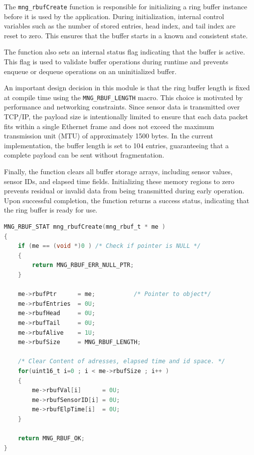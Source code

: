 \documentclass{article}
\begin{document}
The \texttt{mng\_rbufCreate} function is responsible for initializing a ring buffer 
instance before it is used by the application. During initialization, internal control 
variables such as the number of stored entries, head index, and tail index are reset to 
zero. This ensures that the buffer starts in a known and consistent state.

The function also sets an internal status flag indicating that the buffer is active. 
This flag is used to validate buffer operations during runtime and prevents enqueue or 
dequeue operations on an uninitialized buffer.

An important design decision in this module is that the ring buffer length is fixed at 
compile time using the \texttt{MNG\_RBUF\_LENGTH} macro. This choice is motivated by 
performance and networking constraints. Since sensor data is transmitted over TCP/IP, 
the payload size is intentionally limited to ensure that each data packet fits within a 
single Ethernet frame and does not exceed the maximum transmission unit (MTU) of 
approximately 1500 bytes. In the current implementation, the buffer length is set to 
104 entries, guaranteeing that a complete payload can be sent without fragmentation.

Finally, the function clears all buffer storage arrays, including sensor values, sensor 
IDs, and elapsed time fields. Initializing these memory regions to zero prevents 
residual or invalid data from being transmitted during early operation. Upon successful 
completion, the function returns a success status, indicating that the ring buffer is 
ready for use.

\begin{lstlisting}[language=C,
caption={Ring Buffer Create API},
label={lst:mng_rbufCreate_api}]
MNG_RBUF_STAT mng_rbufCreate(mng_rbuf_t * me )
{
    if (me == (void *)0 ) /* Check if pointer is NULL */
    {
        return MNG_RBUF_ERR_NULL_PTR;
    }

    me->rbufPtr      = me;           /* Pointer to object*/
    me->rbufEntries  = 0U;
    me->rbufHead     = 0U;
    me->rbufTail     = 0U;
    me->rbufAlive    = 1U;
    me->rbufSize     = MNG_RBUF_LENGTH;

    /* Clear Content of adresses, elapsed time and id space. */
    for(uint16_t i=0 ; i < me->rbufSize ; i++ )
    {
        me->rbufVal[i]      = 0U;
        me->rbufSensorID[i] = 0U;
        me->rbufElpTime[i]  = 0U;
    }

    return MNG_RBUF_OK;
}
\end{lstlisting}
\end{document}
